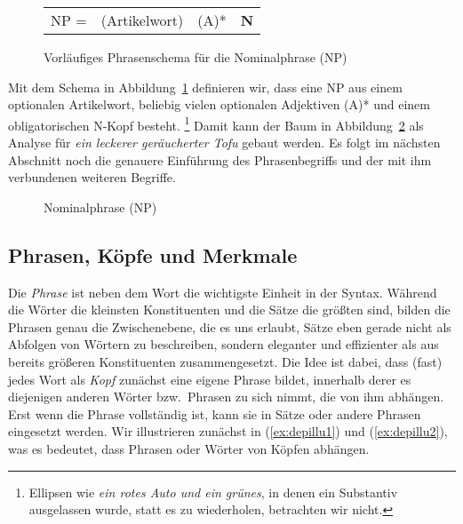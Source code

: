 \begin{figure}[!htbp]
  \centering
  \begin{tabular}{c|c|c|c|}
    \cline{2-4}
    NP = & (Artikelwort) & (A)* & \textbf{N} \\
    \cline{2-4}
  \end{tabular}
  \caption{Vorläufiges Phrasenschema für die Nominalphrase (NP)}
  \label{fig:strschembsp}
\end{figure}

Mit dem Schema in Abbildung~\ref{fig:strschembsp} definieren wir, dass eine NP aus einem optionalen Artikelwort, beliebig vielen optionalen Adjektiven (A)* und einem obligatorischen N-Kopf besteht.%
\footnote{Ellipsen wie \zB \textit{ein rotes Auto und ein grünes}, in denen ein Substantiv ausgelassen wurde, statt es zu wiederholen, betrachten wir nicht.}
Damit kann der Baum in Abbildung~\ref{fig:vnflach} als Analyse für \textit{ein leckerer geräucherter Tofu} gebaut werden.
Es folgt im nächsten Abschnitt noch die genauere Einführung des Phrasenbegriffs und der mit ihm verbundenen weiteren Begriffe.

\begin{figure}[!htbp]
  \centering
  \caption{Nominalphrase (NP)}
  \label{fig:vnflach}
\end{figure}

\subsection{Phrasen, Köpfe und Merkmale}

\label{sec:koepfevalenzmaximalitaet}

Die \textit{Phrase} ist neben dem Wort die wichtigste Einheit in der Syntax.
Während die Wörter die kleinsten Konstituenten und die Sätze die größten sind, bilden die Phrasen genau die Zwischenebene, die es uns erlaubt, Sätze eben gerade nicht als Abfolgen von Wörtern zu beschreiben,
sondern eleganter und effizienter als aus bereits größeren Konstituenten zusammengesetzt.
Die Idee ist dabei, dass (fast) jedes Wort als \textit{Kopf} zunächst eine eigene Phrase bildet, innerhalb derer es diejenigen anderen Wörter bzw.\ Phrasen zu sich nimmt, die von ihm abhängen.
Erst wenn die Phrase vollständig ist, kann sie in Sätze oder andere Phrasen eingesetzt werden.
Wir illustrieren zunächst in (\ref{ex:depillu1}) und (\ref{ex:depillu2}), was es bedeutet, dass Phrasen oder Wörter von Köpfen abhängen.

